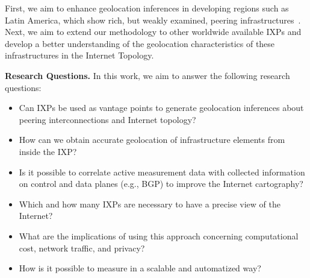 	First, we aim to enhance geolocation inferences in developing regions such as Latin America, which show rich, but weakly examined, peering infrastructures~\cite{IXbr, DissectingBrazilianIXP}. Next, we aim to extend our methodology to other worldwide available IXPs and develop a better understanding of the geolocation characteristics of these infrastructures in the Internet Topology.




	\textbf{Research Questions.} In this work, we aim to answer the following research questions: 

	\begin{itemize}
	\item Can IXPs be used as vantage points to generate geolocation inferences about peering interconnections and Internet topology? 
	\item How can we obtain accurate geolocation of infrastructure elements from inside the IXP? 
	\item Is it possible to correlate active measurement data with collected information on control and data planes (e.g., BGP) to improve the Internet cartography?
	\item Which and how many IXPs are necessary to have a precise view of the Internet? 
	\item What are the implications of using this approach concerning computational cost, network traffic, and privacy? 
	\item How is it possible to measure in a scalable and automatized way?
	\end{itemize}

